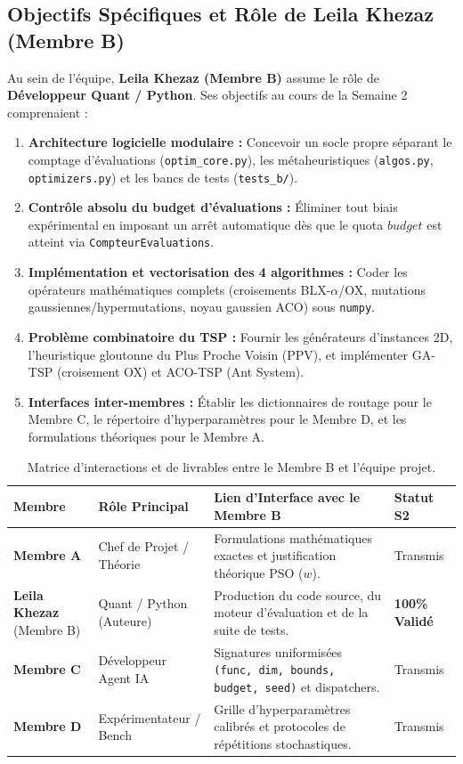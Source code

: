 \documentclass[11pt,a4paper]{article}
\begin{document}
\subsection{Objectifs Spécifiques et Rôle de Leila Khezaz (Membre B)}
Au sein de l'équipe, \textbf{Leila Khezaz (Membre B)} assume le rôle de \textbf{Développeur Quant / Python}. Ses objectifs au cours de la Semaine 2 comprenaient :
\begin{enumerate}\setlength{\itemsep}{0.1em}
    \item \textbf{Architecture logicielle modulaire :} Concevoir un socle propre séparant le comptage d'évaluations (\texttt{optim\_core.py}), les métaheuristiques (\texttt{algos.py}, \texttt{optimizers.py}) et les bancs de tests (\texttt{tests\_b/}).
    \item \textbf{Contrôle absolu du budget d'évaluations :} Éliminer tout biais expérimental en imposant un arrêt automatique dès que le quota $budget$ est atteint via \texttt{CompteurEvaluations}.
    \item \textbf{Implémentation et vectorisation des 4 algorithmes :} Coder les opérateurs mathématiques complets (croisements BLX-$\alpha$/OX, mutations gaussiennes/hypermutations, noyau gaussien ACO) sous \texttt{numpy}.
    \item \textbf{Problème combinatoire du TSP :} Fournir les générateurs d'instances 2D, l'heuristique gloutonne du Plus Proche Voisin (PPV), et implémenter GA-TSP (croisement OX) et ACO-TSP (Ant System).
    \item \textbf{Interfaces inter-membres :} Établir les dictionnaires de routage pour le Membre C, le répertoire d'hyperparamètres pour le Membre D, et les formulations théoriques pour le Membre A.
\end{enumerate}

\begin{table}[H]
\centering
\small
\begin{tabularx}{\textwidth}{llXl}
\toprule
\textbf{Membre} & \textbf{Rôle Principal} & \textbf{Lien d'Interface avec le Membre B} & \textbf{Statut S2} \\
\midrule
\textbf{Membre A} & Chef de Projet / Théorie & Formulations mathématiques exactes et justification théorique PSO ($w$). & Transmis \\
\textbf{Leila Khezaz} (Membre B) & Quant / Python (Auteure) & Production du code source, du moteur d'évaluation et de la suite de tests. & \textbf{100\% Validé} \\
\textbf{Membre C} & Développeur Agent IA & Signatures uniformisées \texttt{(func, dim, bounds, budget, seed)} et dispatchers. & Transmis \\
\textbf{Membre D} & Expérimentateur / Bench & Grille d'hyperparamètres calibrés et protocoles de répétitions stochastiques. & Transmis \\
\bottomrule
\end{tabularx}
\caption{Matrice d'interactions et de livrables entre le Membre B et l'équipe projet.}
\label{tab:interaction_membres}
\end{table}
\end{document}
